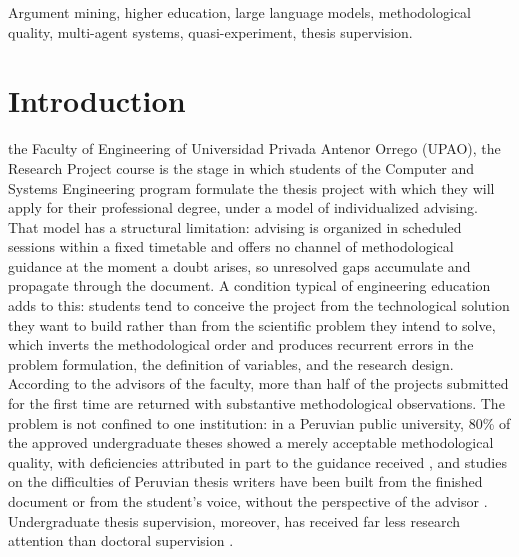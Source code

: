 \documentclass[journal]{IEEEtran}
\begin{document}
\begin{IEEEkeywords}
Argument mining, higher education, large language models, methodological quality, multi-agent systems, quasi-experiment, thesis supervision.
\end{IEEEkeywords}

\IEEEpeerreviewmaketitle

\section{Introduction}

 the Faculty of Engineering of Universidad Privada Antenor Orrego (UPAO), the Research Project course is the stage in which students of the Computer and Systems Engineering program formulate the thesis project with which they will apply for their professional degree, under a model of individualized advising. That model has a structural limitation: advising is organized in scheduled sessions within a fixed timetable and offers no channel of methodological guidance at the moment a doubt arises, so unresolved gaps accumulate and propagate through the document. A condition typical of engineering education adds to this: students tend to conceive the project from the technological solution they want to build rather than from the scientific problem they intend to solve, which inverts the methodological order and produces recurrent errors in the problem formulation, the definition of variables, and the research design. According to the advisors of the faculty, more than half of the projects submitted for the first time are returned with substantive methodological observations. The problem is not confined to one institution: in a Peruvian public university, 80\% of the approved undergraduate theses showed a merely acceptable methodological quality, with deficiencies attributed in part to the guidance received \cite{estrada2022}, and studies on the difficulties of Peruvian thesis writers have been built from the finished document or from the student's voice, without the perspective of the advisor \cite{perdomo2022,vilca2023}. Undergraduate thesis supervision, moreover, has received far less research attention than doctoral supervision \cite{agricola2021}.
\end{document}
